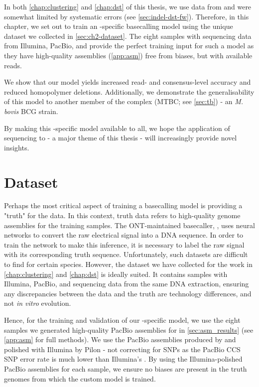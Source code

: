In both \autoref{chap:clustering} and \autoref{chap:dst} of this thesis, we use \ont{} data from \mtb{} and were somewhat limited by systematic errors (see \autoref{sec:indel-dst-fw}). Therefore, in this chapter, we set out to train an \mtb{}-specific \ont{} basecalling model using the unique dataset we collected in \autoref{sec:ch2-dataset}. The eight samples with sequencing data from Illumina, PacBio, and \ont{} provide the perfect training input for such a model as they have high-quality assemblies (\autoref{app:asm}) free from \ont{} biases, but with available \ont{} reads.

We show that our \mtb{} \ont{} model yields increased read- and consensus-level accuracy and reduced homopolymer deletions. Additionally, we demonstrate the generalisability of this model to another member of the \mtb{} complex (MTBC; see \autoref{sec:tb}) - an \textit{M. bovis} BCG strain.

By making this \mtb{}-specific model available to all, we hope the application of \ont{} sequencing to \mtb{} - a major theme of this thesis - will increasingly provide novel insights.

\section{Dataset}
\label{sec:tubby-data}

Perhaps the most critical aspect of training a basecalling model is providing a "truth" for the data. In this context, truth data refers to high-quality genome assemblies for the training samples. The ONT-maintained basecaller, \guppy{}, uses neural networks to convert the raw electrical signal into a DNA sequence. In order to train the network to make this inference, it is necessary to label the raw signal with its corresponding truth sequence. Unfortunately, such datasets are difficult to find for certain species. However, the dataset we have collected for the work in \autoref{chap:clustering} and \autoref{chap:dst} is ideally suited. It contains samples with Illumina, PacBio, and \ont{} sequencing data from the same DNA extraction, ensuring any discrepancies between the \ont{} data and the truth are technology differences, and not \textit{in vitro} evolution. 

Hence, for the training and validation of our \mtb{}-specific model, we use the eight samples we generated high-quality PacBio assemblies for in \autoref{sec:asm_results} (see \autoref{app:asm} for full methods). We use the PacBio assemblies produced by \flye{} and polished with Illumina by Pilon - not correcting for SNPs as the PacBio CCS SNP error rate is much lower than Illumina's \cite{wenger2019}. By using the Illumina-polished PacBio assemblies for each sample, we ensure no \ont{} biases are present in the truth genomes from which the custom model is trained.

